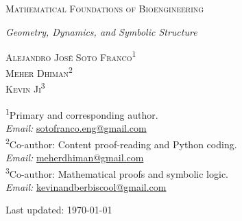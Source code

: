\documentclass[11pt,reqno]{amsart}
\begin{document}

\thispagestyle{empty}

\begin{center}
\vspace*{2.5cm}

{\fontsize{18pt}{20pt}\selectfont\scshape
Mathematical Foundations of Bioengineering\par}
\vspace{0.5cm}
{\large\itshape Geometry, Dynamics, and Symbolic Structure\par}

\vspace{1.8cm}

{\normalsize
\textsc{Alejandro Jos\'e Soto Franco}\textsuperscript{1} \\
\textsc{Meher Dhiman}\textsuperscript{2} \\
\textsc{Kevin Ji}\textsuperscript{3} \\
}

\vspace{1.5cm}
\end{center}

{\scriptsize
\begin{flushleft}
\textsuperscript{1}Primary and corresponding author.\\ \hspace*{1.5em}\textit{Email:} \href{mailto:sotofranco.eng@gmail.com}{sotofranco.eng@gmail.com} \\
\textsuperscript{2}Co-author: Content proof-reading and Python coding.\\
 \hspace*{1.5em}\textit{Email:} \href{mailto:meherdhiman@gmail.com}{meherdhiman@gmail.com} \\
\textsuperscript{3}Co-author: Mathematical proofs and symbolic logic.\\
 \hspace*{1.5em}\textit{Email:} \href{mailto:kevinandberbiscool@gmail.com}{kevinandberbiscool@gmail.com} \\
\end{flushleft}
}

\vspace{2cm}
\begin{center}
{\normalsize Last updated: \today\par}
\end{center}
\end{document}
